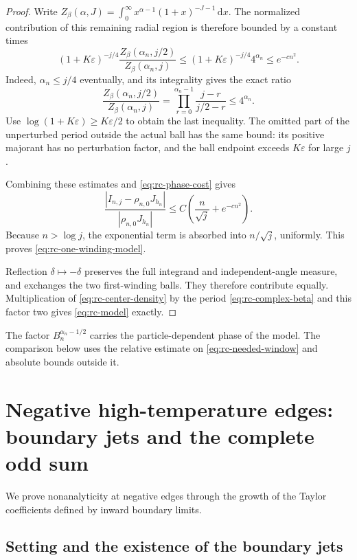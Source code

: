 \documentclass[11pt]{article}
\numberwithin{equation}{section}
\theoremstyle{definition}
\newcommand{\dd}{\,\mathrm d}
\begin{document}
\begin{proof}
Write
$Z_\beta(\alpha,J)=\int_0^\infty
x^{\alpha-1}(1+x)^{-J-1}\dd x$.
The normalized contribution of this remaining radial region is
therefore bounded by a constant times
\begin{equation}\label{eq:rc-radial-tail}
 (1+K\varepsilon)^{-j/4}
 \frac{Z_\beta(\alpha_n,j/2)}{Z_\beta(\alpha_n,j)}
 \le (1+K\varepsilon)^{-j/4}4^{\alpha_n}
 \le e^{-cn^2}.
\end{equation}
Indeed, $\alpha_n\le j/4$ eventually, and its integrality gives
the exact ratio
\[
 \frac{Z_\beta(\alpha_n,j/2)}{Z_\beta(\alpha_n,j)}
 =\prod_{r=0}^{\alpha_n-1}\frac{j-r}{j/2-r}\le4^{\alpha_n}.
\]
Use $\log(1+K\varepsilon)\ge K\varepsilon/2$ to obtain the
last inequality.  The omitted part of the unperturbed period
outside the actual ball has the same bound: its positive majorant
has no perturbation factor, and the ball endpoint exceeds
$K\varepsilon$ for large $j$.

Combining these estimates and \eqref{eq:rc-phase-cost} gives
\[
 \frac{|I_{n,j}-\rho_{n,0}J_{h_n}|}
 { |\rho_{n,0}J_{h_n}|}
 \le C\left(\frac n{\sqrt j}+e^{-cn^2}\right).
\]
Because $n>\log j$, the exponential term is absorbed into
$n/\sqrt j$, uniformly.  This proves
\eqref{eq:rc-one-winding-model}.

Reflection $\delta\mapsto-\delta$ preserves the full integrand
and independent-angle measure, and exchanges the two first-winding
balls.  They therefore contribute equally.  Multiplication of
\eqref{eq:rc-center-density} by the period
\eqref{eq:rc-complex-beta} and this factor two gives
\eqref{eq:rc-model} exactly.
\end{proof}

The factor $B_n^{\alpha_n-1/2}$ carries the particle-dependent phase
of the model. The comparison below uses the relative estimate on
\eqref{eq:rc-needed-window} and absolute bounds outside it.

\section{Negative high-temperature edges: boundary jets and the complete odd sum}
\label{sec:jets}

We prove nonanalyticity at negative edges through the growth of the
Taylor coefficients defined by inward boundary limits.

\subsection{Setting and the existence of the boundary jets}
\end{document}
